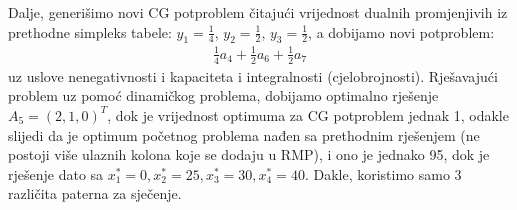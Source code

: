 \documentclass[a4paper, utf8, 11pt, colorlinks]{book}
\begin{document}
Dalje, generišimo novi CG potproblem čitajući vrijednost dualnih promjenjivih iz prethodne simpleks tabele: $y_1 = \frac{1}{4}$, $y_2 = \frac{1}{2}$, $y_3= \frac{1}{2}$, a dobijamo novi potproblem:
\begin{align*}
	 \frac{1}{4} a_4 + \frac{1}{2} a_6 + \frac{1}{2} a_7
\end{align*}
uz uslove nenegativnosti i kapaciteta i integralnosti (cjelobrojnosti). Rješavajući problem uz pomoć dinamičkog problema, dobijamo optimalno rješenje $A_5 = (2,1,0)^T$, dok je vrijednost optimuma za CG potproblem jednak 1, odakle slijedi da je optimum početnog problema nađen sa prethodnim rješenjem (ne postoji više ulaznih kolona koje se dodaju u RMP), i ono je jednako 95, dok je rješenje dato sa $x_1^* = 0, x_2^* = 25, x_3^*=30, x_4^*= 40$. Dakle, koristimo samo 3 različita paterna za sječenje. 
\\ \vspace{1cm}
  
\end{document}

